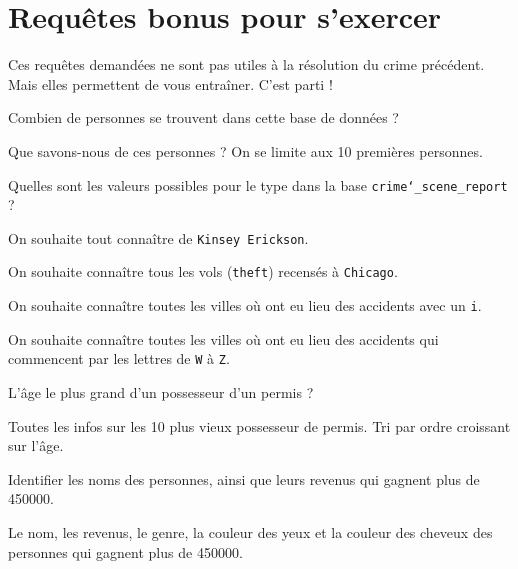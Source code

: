 \section{Requêtes bonus pour s'exercer}
Ces requêtes demandées ne sont pas utiles à la résolution du crime précédent. Mais elles permettent de vous entraîner. C'est parti !

\question{}
Combien de personnes se trouvent dans cette base de données ?


\question{}
Que savons-nous de ces personnes ? On se limite aux 10 premières personnes.


\question{}
Quelles sont les valeurs possibles pour le type dans la base \texttt{crime`\_scene\_report} ?


\question{}
On souhaite tout connaître de \texttt{Kinsey Erickson}.



\question{}
On souhaite connaître tous les vols (\texttt{theft}) recensés à \texttt{Chicago}.


\question{}
On souhaite connaître toutes les villes où ont eu lieu des accidents avec un \texttt{i}.


\question{}
On souhaite connaître toutes les villes où ont eu lieu des accidents qui commencent par les lettres  de \texttt{W} à \texttt{Z}.



\question{}
L'âge le plus grand d'un possesseur d'un permis ?



\question{}
Toutes les infos sur les 10 plus vieux possesseur de permis. Tri par ordre croissant sur l'âge.



\question{}
Identifier les noms des personnes, ainsi que leurs revenus qui gagnent plus de \num{450000}.



\question{}
Le nom, les revenus, le genre, la couleur des yeux et la couleur des cheveux des personnes qui gagnent plus de \num{450000}.




